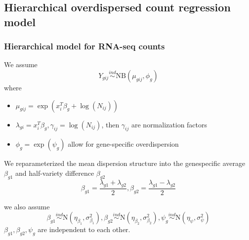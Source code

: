 \documentclass[handout,10pt]{beamer}
\newcommand{\ind}{\stackrel{ind}{\sim}}
\begin{document}
\subsection{Hierarchical overdispersed count regression model}

\begin{frame}
\frametitle{Hierarchical model for RNA-seq counts}

We assume 
\[ 
Y_{gij} \ind \text{NB} \left (\mu_{gij}, \phi_g \right )
\]
\pause
where 
\begin{itemize}[<+->]
\item $\mu_{gij} = \exp(x_i^T\beta_g + \log(N_{ij}))$
\item $\lambda_{gi} = x_i^T\beta_g, \gamma_{ij} = \log(N_{ij})$, then $\gamma_{ij}$ are normalization factors
\item $\phi_{g} = \exp(\psi_g)$ allow for gene-specific overdispersion
\end{itemize}

We reparameterized the mean dispersion structure into the genespecific average $\beta_{g1}$ and half-variety difference $\beta_{g2}$ 
\begin{equation} 
\beta_{g1} = \frac{\lambda_{g1}+\lambda_{g2}}{2}, \beta_{g2} = \frac{\lambda_{g1}-\lambda_{g2}}{2}
\end{equation}

we also assume 
\begin{equation} 
\beta_{g1}  \ind \text{N} \left ( \eta_{\beta_{1}}, \sigma^2_{\beta_1} \right ), 
\beta_{g2} \ind \text{N} \left ( \eta_{\beta_2}, \sigma^2_{\beta_2} \right ),
\psi_g \ind \text{N} \left (\eta_{\psi} , \sigma^2_{\psi}  \right )
\end{equation}
$\beta_{g1}, \beta_{g2}, \psi_g$ are independent to each other.

\end{frame}
\end{document}
